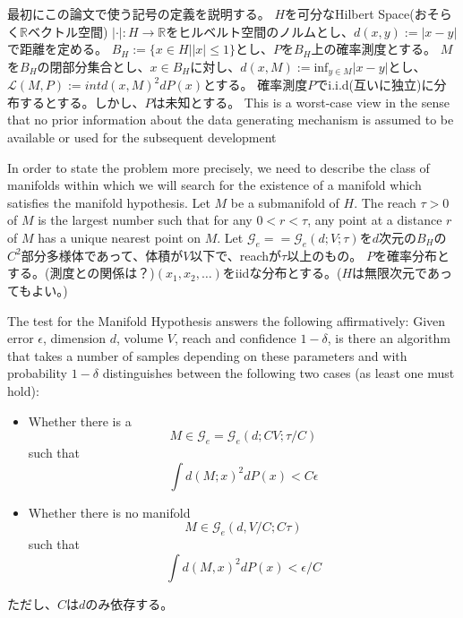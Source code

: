 \documentclass{ujarticle}
\begin{document}
最初にこの論文で使う記号の定義を説明する。
$H$を可分なHilbert Space(おそらく$\mathbb{R}$ベクトル空間)
$| \cdot |:H \to \mathbb{R}$をヒルベルト空間のノルムとし、$d(x,y):=|x-y|$で距離を定める。
$B_H:=\{x \in H| |x| \le 1\}$とし、$P$を$B_H$上の確率測度とする。
$M$を$B_H$の閉部分集合とし、$x \in B_H$に対し、$d(x,M):=\mathrm{inf}_{y \in M}|x -y |$とし、
$\mathcal{L}(M,P):=int d(x,M)^2 dP(x)$とする。
確率測度$P$でi.i.d(互いに独立)に分布するとする。しかし、$P$は未知とする。
This is a worst-case view in the sense that no prior information
about the data generating mechanism is assumed to be available or used for the subsequent development

In order to state the problem more precisely, we need to describe the class of manifolds within which we
will search for the existence of a manifold which satisfies the manifold hypothesis.
Let $M$ be a submanifold of $H$. The reach $ \tau > 0$ of $M$ is the largest number such that
for any $0 < r < \tau$, any point at a distance $r$ of $M$ has a unique nearest point on $M$.
Let $\mathcal{G}_e == \mathcal{G}_e(d; V;\tau)$を$d$次元の$B_H$の$C^2$部分多様体であって、体積が$V$以下で、reachが$\tau$以上のもの。
$P$を確率分布とする。(測度との関係は？)$(x_1,x_2,\dots)$をiidな分布とする。($H$は無限次元であってもよい。)

The test for the Manifold Hypothesis answers the following affirmatively: Given error $\epsilon$, dimension $d$,
volume $V$, reach and confidence $1 - \delta$, is there an algorithm that takes a number of samples depending on
these parameters and with probability $1 - \delta$ distinguishes between the following two cases (as least one must
hold):
\begin{itemize}
  \item Whether there is a
  \begin{equation*}
    M \in \mathcal{G}_e = \mathcal{G}_e(d;CV;\tau/C)
  \end{equation*}
  such that
  \begin{equation*}
    \int d(M; x)^2 dP(x) < C \epsilon
  \end{equation*}
  \item Whether there is no manifold
  \begin{equation*}
    M \in \mathcal{G}_e(d, V/C; C\tau)
  \end{equation*}
  such that
  \begin{equation*}
    \int d(M,x)^2dP(x) < \epsilon/C
  \end{equation*}
\end{itemize}
ただし、$C$は$d$のみ依存する。
\end{document}
